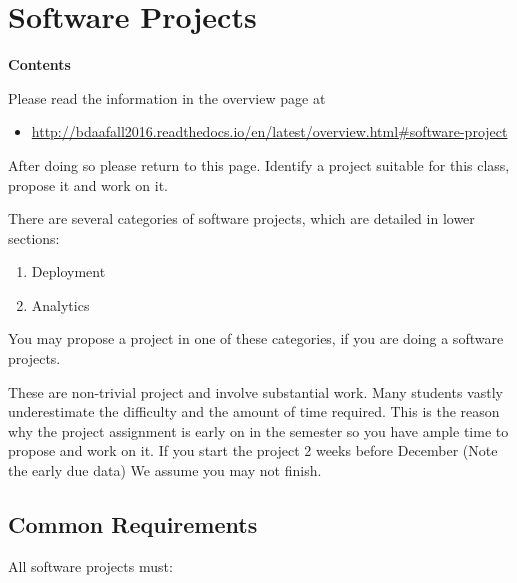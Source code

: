 \section{Software Projects}\label{software-projects}

\textbf{Contents}

Please read the information in the overview page at

\begin{itemize}

\item
  \url{http://bdaafall2016.readthedocs.io/en/latest/overview.html\#software-project}
\end{itemize}

After doing so please return to this page. Identify a project suitable
for this class, propose it and work on it.

There are several categories of software projects, which are detailed in
lower sections:

\begin{enumerate}

\item
  Deployment
\item
  Analytics
\end{enumerate}

You may propose a project in one of these categories, if you are doing a
software projects.

These are non-trivial project and involve substantial work. Many
students vastly underestimate the difficulty and the amount of time
required. This is the reason why the project assignment is early on in
the semester so you have ample time to propose and work on it. If you
start the project 2 weeks before December (Note the early due data) We
assume you may not finish.

\subsection{Common Requirements}\label{common-requirements}

All software projects must:

